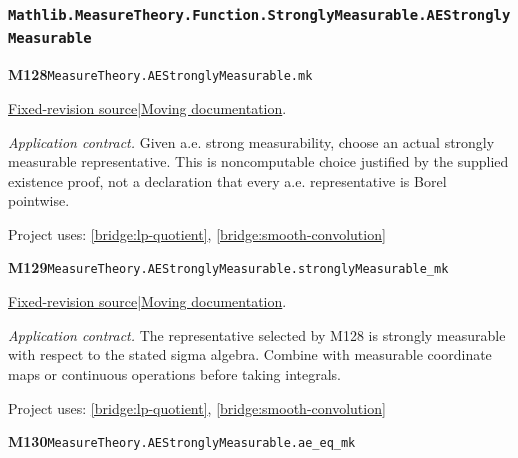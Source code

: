 \documentclass[11pt,a4paper]{article}
\theoremstyle{definition}
\theoremstyle{remark}
\begin{document}
\subsubsection*{\nolinkurl{Mathlib.MeasureTheory.Function.StronglyMeasurable.AEStronglyMeasurable}}
\noindent\textbf{M128}\label{base:M128}\quad\nolinkurl{MeasureTheory.AEStronglyMeasurable.mk}

\href{https://github.com/leanprover-community/mathlib4/blob/9bac2d0692944a775113f7c130fd5e5b4608a854/Mathlib/MeasureTheory/Function/StronglyMeasurable/AEStronglyMeasurable.lean}{Fixed-revision source}\quad|\quad\href{https://leanprover-community.github.io/mathlib4_docs/Mathlib/MeasureTheory/Function/StronglyMeasurable/AEStronglyMeasurable.html#MeasureTheory.AEStronglyMeasurable.mk}{Moving documentation}.\par
\noindent\textit{Application contract.} Given a.e. strong measurability, choose an actual strongly measurable representative. This is noncomputable choice justified by the supplied existence proof, not a declaration that every a.e. representative is Borel pointwise.\par
{\small Project uses: \ref{bridge:lp-quotient}, \ref{bridge:smooth-convolution}}\par\medskip

\noindent\textbf{M129}\label{base:M129}\quad\nolinkurl{MeasureTheory.AEStronglyMeasurable.stronglyMeasurable_mk}

\href{https://github.com/leanprover-community/mathlib4/blob/9bac2d0692944a775113f7c130fd5e5b4608a854/Mathlib/MeasureTheory/Function/StronglyMeasurable/AEStronglyMeasurable.lean}{Fixed-revision source}\quad|\quad\href{https://leanprover-community.github.io/mathlib4_docs/Mathlib/MeasureTheory/Function/StronglyMeasurable/AEStronglyMeasurable.html#MeasureTheory.AEStronglyMeasurable.stronglyMeasurable_mk}{Moving documentation}.\par
\noindent\textit{Application contract.} The representative selected by M128 is strongly measurable with respect to the stated sigma algebra. Combine with measurable coordinate maps or continuous operations before taking integrals.\par
{\small Project uses: \ref{bridge:lp-quotient}, \ref{bridge:smooth-convolution}}\par\medskip

\noindent\textbf{M130}\label{base:M130}\quad\nolinkurl{MeasureTheory.AEStronglyMeasurable.ae_eq_mk}
\end{document}
